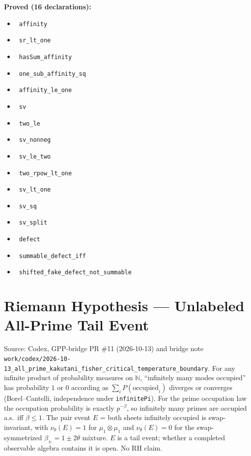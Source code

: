 \documentclass{report}
\theoremstyle{definition}
\begin{document}
\noindent\textbf{Proved (16 declarations):}
\begin{itemize}
  \item {}\leanok\ \texttt{affinity}
  \item {}\leanok\ \texttt{sr\_lt\_one}
  \item {}\leanok\ \texttt{hasSum\_affinity}
  \item {}\leanok\ \texttt{one\_sub\_affinity\_sq}
  \item {}\leanok\ \texttt{affinity\_le\_one}
  \item {}\leanok\ \texttt{sv}
  \item {}\leanok\ \texttt{two\_le}
  \item {}\leanok\ \texttt{sv\_nonneg}
  \item {}\leanok\ \texttt{sv\_le\_two}
  \item {}\leanok\ \texttt{two\_rpow\_lt\_one}
  \item {}\leanok\ \texttt{sv\_lt\_one}
  \item {}\leanok\ \texttt{sv\_sq}
  \item {}\leanok\ \texttt{sv\_split}
  \item {}\leanok\ \texttt{defect}
  \item {}\leanok\ \texttt{summable\_defect\_iff}
  \item {}\leanok\ \texttt{shifted\_fake\_defect\_not\_summable}
\end{itemize}

\section{Riemann Hypothesis --- Unlabeled All-Prime Tail Event}
Source: Codex, GPP-bridge PR \#11 (2026-10-13) and bridge note \texttt{work/codex/2026-10-13\_all\_prime\_kakutani\_fisher\_critical\_temperature\_boundary}. For any infinite product of probability measures on $\mathbb N$, ``infinitely many modes occupied'' has probability $1$ or $0$ according as $\sum_i P(\text{occupied}_i)$ diverges or converges (Borel--Cantelli, independence under \texttt{infinitePi}). For the prime occupation law the occupation probability is exactly $p^{-\beta}$, so infinitely many primes are occupied a.s.\ iff $\beta\le1$. The pair event $E$ = both sheets infinitely occupied is swap-invariant, with $\nu_0(E)=1$ for $\mu_1\otimes\mu_1$ and $\nu_\theta(E)=0$ for the swap-symmetrized $\beta_\pm=1\pm2\theta$ mixture. $E$ is a tail event; whether a completed observable algebra contains it is open. No RH claim.
\end{document}
